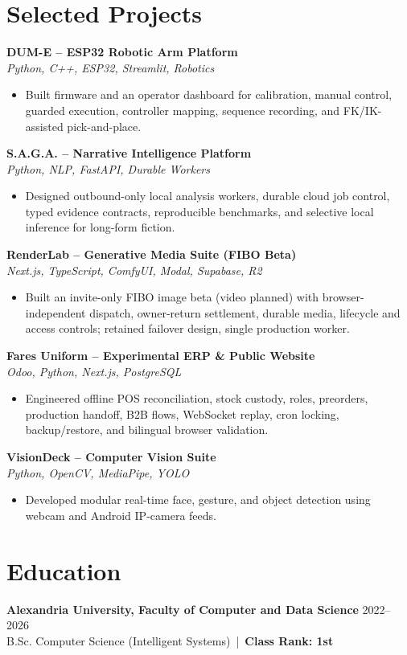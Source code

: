 \documentclass[letterpaper]{article}
\newcommand{\projectheader}[2]{\textbf{#1} \\\textit{#2} \\}
\begin{document}
\section*{Selected Projects}
\projectheader{DUM-E -- ESP32 Robotic Arm Platform}{Python, C++, ESP32, Streamlit, Robotics}
\begin{itemize}
\item Built firmware and an operator dashboard for calibration, manual control, guarded execution, controller mapping, sequence recording, and FK/IK-assisted pick-and-place.
\end{itemize}
\projectheader{S.A.G.A. -- Narrative Intelligence Platform}{Python, NLP, FastAPI, Durable Workers}
\begin{itemize}
\item Designed outbound-only local analysis workers, durable cloud job control, typed evidence contracts, reproducible benchmarks, and selective local inference for long-form fiction.
\end{itemize}
\projectheader{RenderLab -- Generative Media Suite (FIBO Beta)}{Next.js, TypeScript, ComfyUI, Modal, Supabase, R2}
\begin{itemize}
\item Built an invite-only FIBO image beta (video planned) with browser-independent dispatch, owner-return settlement, durable media, lifecycle and access controls; retained failover design, single production worker.
\end{itemize}
\projectheader{Fares Uniform -- Experimental ERP \& Public Website}{Odoo, Python, Next.js, PostgreSQL}
\begin{itemize}
\item Engineered offline POS reconciliation, stock custody, roles, preorders, production handoff, B2B flows, WebSocket replay, cron locking, backup/restore, and bilingual browser validation.
\end{itemize}
\projectheader{VisionDeck -- Computer Vision Suite}{Python, OpenCV, MediaPipe, YOLO}
\begin{itemize}
\item Developed modular real-time face, gesture, and object detection using webcam and Android IP-camera feeds.
\end{itemize}

\section*{Education}
\textbf{Alexandria University, Faculty of Computer and Data Science} \hfill 2022--2026\\
B.Sc. Computer Science (Intelligent Systems) \,|\, \textbf{Class Rank: 1st}
\end{document}

